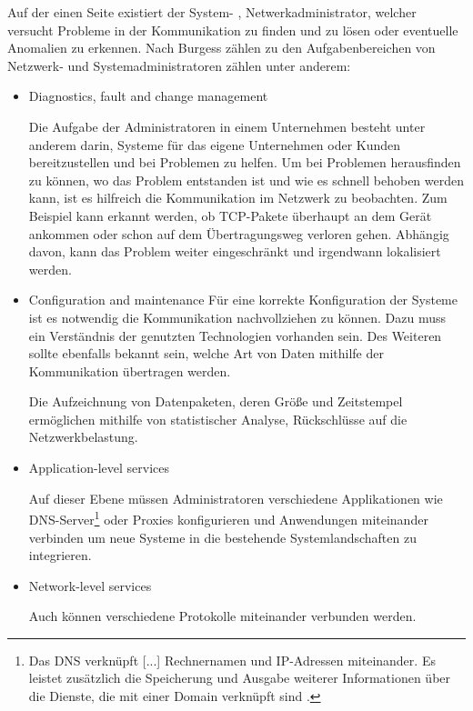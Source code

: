     Auf der einen Seite existiert der System- , Netwerkadministrator, welcher versucht Probleme in der Kommunikation zu finden und zu lösen oder eventuelle Anomalien zu erkennen.
    Nach Burgess \cite{burgess2004principles} zählen zu den Aufgabenbereichen von Netzwerk- und Systemadministratoren zählen unter anderem:
    \begin{itemize}
        \item \glqq Diagnostics, fault and change management\grqq{}
        
        Die Aufgabe der Administratoren in einem Unternehmen besteht unter anderem darin, Systeme für das eigene Unternehmen oder Kunden bereitzustellen und bei Problemen zu helfen. Um bei Problemen herausfinden zu können, wo das Problem entstanden ist und wie es schnell behoben werden kann, ist es hilfreich die Kommunikation im Netzwerk zu beobachten. Zum Beispiel kann erkannt werden, ob \ac{TCP}-Pakete überhaupt an dem Gerät ankommen oder schon auf dem Übertragungsweg verloren gehen. Abhängig davon, kann das Problem weiter eingeschränkt und irgendwann lokalisiert werden.
        
        \item \glqq Configuration and maintenance\grqq{}
        Für eine korrekte Konfiguration der Systeme ist es notwendig die Kommunikation nachvollziehen zu können. Dazu muss ein Verständnis der genutzten Technologien vorhanden sein. Des Weiteren sollte ebenfalls bekannt sein, welche Art von Daten mithilfe der Kommunikation übertragen werden.
        
        Die Aufzeichnung von Datenpaketen, deren Größe und Zeitstempel ermöglichen mithilfe von statistischer Analyse, Rückschlüsse auf die Netzwerkbelastung.
        
        \item \glqq Application-level services\grqq{}
        
        Auf dieser Ebene müssen Administratoren verschiedene Applikationen wie \ac{DNS}-Server\footnote{\glqq Das DNS verknüpft [...] Rechnernamen und IP-Adressen miteinander. Es leistet zusätzlich die Speicherung und Ausgabe weiterer Informationen über die Dienste, die mit einer Domain verknüpft sind \cite{denic_eg}.\grqq{}} oder Proxies konfigurieren und Anwendungen miteinander verbinden um neue Systeme in die bestehende Systemlandschaften zu integrieren.
        
        \item \glqq Network-level services\grqq{}
        
        Auch können verschiedene Protokolle miteinander verbunden werden.
        
    \end{itemize}

